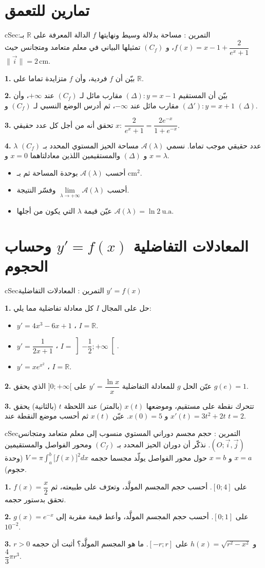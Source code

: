\documentclass[12pt,a4paper]{article}
\newenvironment{BOX}[2]{\begin{otherlanguage}{english}\begin{arbox}{#1}{#2}}{\end{arbox}\end{otherlanguage}}
\newcounter{exo}
\newenvironment{tamrin}[1]{\stepcounter{exo}\begin{BOX}{cSec}{التمرين \theexo: #1}}{\end{BOX}}
\newcommand{\R}{\mathbb{R}}
\newenvironment{sq}{\begin{itemize}[leftmargin=2.4em,itemsep=3pt]}{\end{itemize}}
\newcommand{\qa}{\item[(أ)]}\newcommand{\qb}{\item[(ب)]}\newcommand{\qc}{\item[(جـ)]}\newcommand{\qd}{\item[(د)]}\newcommand{\qe}{\item[(هـ)]}
\newcommand{\QQ}[1]{\par\smallskip\textbf{#1.} }
\begin{document}
\section{تمارين للتعمق}

\begin{tamrin}{مساحة بدلالة وسيط ونهايتها}
$f$ الدالة المعرفة على $\R$ بـ: $f(x)=x-1+\dfrac{2}{e^{x}+1}$، و $(C_f)$ تمثيلها البياني في معلم متعامد ومتجانس حيث $\|\vec i\|=2\,\text{cm}$.
\QQ{1} بيّن أن $f$ فردية، وأن $f$ متزايدة تماما على $\R$.
\QQ{2} بيّن أن المستقيم $(\Delta):y=x-1$ مقارب مائل لـ $(C_f)$ عند $+\infty$، وأن $(\Delta'):y=x+1$ مقارب مائل عند $-\infty$، ثم أدرس الوضع النسبي لـ $(C_f)$ و $(\Delta)$.
\QQ{3} تحقق أنه من أجل كل عدد حقيقي $x$: $\dfrac{2}{e^{x}+1}=\dfrac{2e^{-x}}{1+e^{-x}}$.
\QQ{4} $\lambda$ عدد حقيقي موجب تماما. نسمي $\mathcal{A}(\lambda)$ مساحة الحيز المستوي المحدد بـ $(C_f)$ و $(\Delta)$ والمستقيمين اللذين معادلتاهما $x=0$ و $x=\lambda$.
\begin{sq}
\qa أحسب $\mathcal{A}(\lambda)$ بوحدة المساحة ثم بـ $\text{cm}^{2}$.
\qb أحسب $\lim\limits_{\lambda\to+\infty}\mathcal{A}(\lambda)$ وفسّر النتيجة.
\qc عيّن قيمة $\lambda$ التي يكون من أجلها $\mathcal{A}(\lambda)=\ln2\ \mathrm{u.a}$.
\end{sq}
\end{tamrin}

\section{المعادلات التفاضلية $y'=f(x)$ وحساب الحجوم}

\begin{tamrin}{المعادلات التفاضلية $y'=f(x)$}
\QQ{1} حل على المجال $I$ كل معادلة تفاضلية مما يلي:
\begin{sq}
\qa $y'=4x^{3}-6x+1$ \quad ، \quad $I=\R$.
\qb $y'=\dfrac{1}{2x+1}$ \quad ، \quad $I=\left]-\dfrac12;+\infty\right[$.
\qc $y'=xe^{x^{2}}$ \quad ، \quad $I=\R$.
\end{sq}
\QQ{2} عيّن الحل $g$ للمعادلة التفاضلية $y'=\dfrac{\ln x}{x}$ على $]0;+\infty[$ الذي يحقق $g(e)=1$.
\QQ{3} تتحرك نقطة على مستقيم، وموضعها $x(t)$ (بالمتر) عند اللحظة $t$ (بالثانية) يحقق $x'(t)=3t^{2}+2t$ و $x(0)=5$. عيّن $x(t)$ ثم أحسب موضع النقطة عند $t=2$.
\end{tamrin}

\begin{tamrin}{حجم مجسم دوراني}
المستوي منسوب إلى معلم متعامد ومتجانس $(O;\vec i,\vec j)$. نذكّر أن دوران الحيز المحدد بـ $(C_f)$ ومحور الفواصل والمستقيمين $x=a$ و $x=b$ حول محور الفواصل يولّد مجسما حجمه $V=\pi\displaystyle\int_a^b\big[f(x)\big]^{2}dx$ (وحدة حجوم).
\QQ{1} $f(x)=\dfrac{x}{2}$ على $[0;4]$. أحسب حجم المجسم المولَّد، وتعرّف على طبيعته، ثم تحقق بدستور حجمه.
\QQ{2} $g(x)=e^{-x}$ على $[0;1]$. أحسب حجم المجسم المولَّد، وأعط قيمة مقربة إلى $10^{-2}$.
\QQ{3} $r>0$ و $h(x)=\sqrt{r^{2}-x^{2}}$ على $[-r;r]$. ما هو المجسم المولَّد؟ أثبت أن حجمه $\dfrac43\pi r^{3}$.
\end{tamrin}
\end{document}
